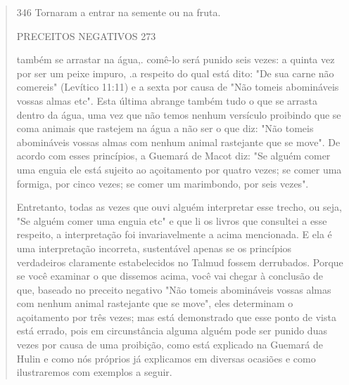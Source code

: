 \begin{quote}
346 Tornaram a entrar na semente ou na fruta.

PRECEITOS NEGATIVOS 273

também se arrastar na água,. comê-lo será punido seis vezes: a quinta
vez por ser um peixe impuro, .a respeito do qual está dito: "De sua
carne não come­reis" (Levítico 11:11) e a sexta por causa de "Não tomeis
abomináveis vossas almas etc". Esta última abrange também tudo o que se
arrasta dentro da água, uma vez que não temos nenhum versículo proibindo
que se coma animais que rastejem na água a não ser o que diz: "Não
tomeis abomináveis vossas almas com nenhum animal rastejante que se
move". De acordo com esses princípios, a Guemará de Macot diz: "Se
alguém comer uma enguia ele está sujeito ao açoi­tamento por quatro
vezes; se comer uma formiga, por cinco vezes; se comer um marimbondo,
por seis vezes".

Entretanto, todas as vezes que ouvi alguém interpretar esse trecho, ou
seja, "Se alguém comer uma enguia etc" e que li os livros que consultei
a esse respeito, a interpretação foi invariavelmente a acima mencionada.
E ela é uma interpretação incorreta, sustentável apenas se os princípios
verdadeiros cla­ramente estabelecidos no Talmud fossem derrubados.
Porque se você exami­nar o que dissemos acima, você vai chegar à
conclusão de que, baseado no pre­ceito negativo "Não tomeis abomináveis
vossas almas com nenhum animal ras­tejante que se move", eles determinam
o açoitamento por três vezes; mas está demonstrado que esse ponto de
vista está errado, pois em circunstância algu­ma alguém pode ser punido
duas vezes por causa de uma proibição, como está explicado na Guemará de
Hulin e como nós próprios já explicamos em diver­sas ocasiões e como
ilustraremos com exemplos a seguir.


\end{quote}
